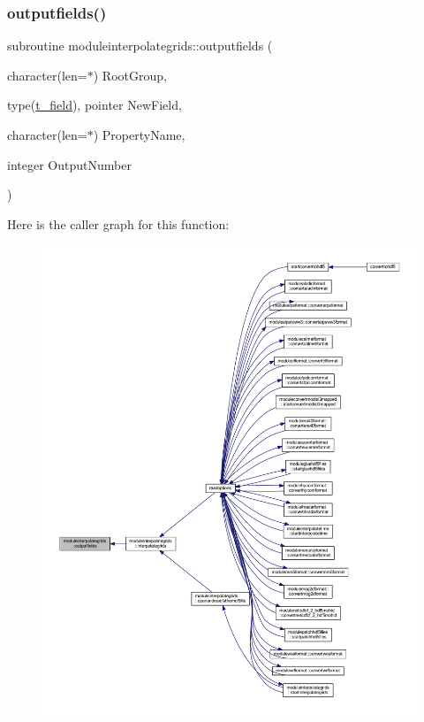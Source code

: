 \mbox{\label{namespacemoduleinterpolategrids_ad87c7dfcb85e39e6f0f2e95dd4f65391}} 
\subsubsection{\texorpdfstring{outputfields()}{outputfields()}}
{\footnotesize\ttfamily subroutine moduleinterpolategrids\+::outputfields (\begin{DoxyParamCaption}\item[{character(len=$\ast$)}]{Root\+Group,  }\item[{type(\mbox{\hyperlink{structmoduleinterpolategrids_1_1t__field}{t\+\_\+field}}), pointer}]{New\+Field,  }\item[{character(len=$\ast$)}]{Property\+Name,  }\item[{integer}]{Output\+Number }\end{DoxyParamCaption})\hspace{0.3cm}{\ttfamily [private]}}

Here is the caller graph for this function\+:\nopagebreak
\begin{figure}[H]
\begin{center}
\leavevmode
\includegraphics[width=350pt]{namespacemoduleinterpolategrids_ad87c7dfcb85e39e6f0f2e95dd4f65391_icgraph}
\end{center}
\end{figure}
\mbox{\label{namespacemoduleinterpolategrids_aa57bfeb2d55f2dec2c8b2e7b627fd6bf}} 
